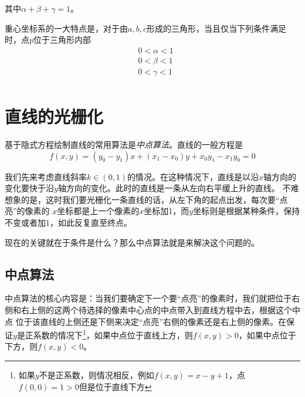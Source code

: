 其中$\alpha+\beta+\gamma=1$。

重心坐标系的一大特点是，对于由$a,b,c$形成的三角形，当且仅当下列条件满足时，点$p$位于三角形内部
\begin{equation}
    \begin{aligned}
        & 0<\alpha<1\\
        & 0<\beta<1\\
        & 0<\gamma<1\\
    \end{aligned}
\end{equation}

\section{直线的光栅化}

基于隐式方程绘制直线的常用算法是\textsl{中点算法}。直线的一般方程是
\begin{equation}
    f(x,y)=(y_0-y_1)x+(x_1-x_0)y+x_0y_1-x_1y_0=0
\end{equation}

我们先来考虑直线斜率$k\in(0,1)$的情况。在这种情况下，直线是以沿$x$轴方向的变化要快于沿$y$轴方向的变化。此时的直线是一条从左向右平缓上升的直线。
不难想象的是，这时我们要光栅化一条直线的话，从左下角的起点出发，每次要“点亮”的像素的 
$x$坐标都是上一个像素的$x$坐标加1，而$y$坐标则是根据某种条件，保持不变或者加1，如此反复直至终点。

现在的关键就在于条件是什么？那么中点算法就是来解决这个问题的。

\subsection*{中点算法}

中点算法的核心内容是：当我们要确定下一个要“点亮”的像素时，我们就把位于右侧和右上侧的这两个待选择的像素中心点的中点带入到直线方程中去，根据这个中点
位于该直线的上侧还是下侧来决定“点亮”右侧的像素还是右上侧的像素。在保证$y$是正系数的情况下\footnote{如果$y$不是正系数，则情况相反，例如$f(x,y)=x-y+1$，点$f(0,0)=1>0$但是位于直线下方}，如果中点位于直线上方，则$f(x,y)>0$，如果中点位于下方，则$f(x,y)<0$。

